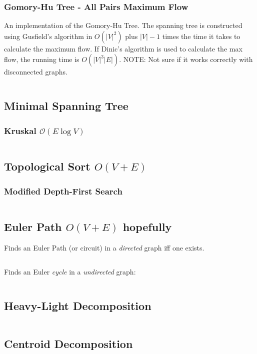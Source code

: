 \documentclass[8pt,a4paper,landscape,oneside]{amsart}
\newcommand{\mintedstyle}[2]{\inputminted[fontsize=\normalsize,baselinestretch=.9,breaklines,tabsize=2]{#1}{code/#2}}
\newcommand{\code}[1]{\mintedstyle{cpp}{#1}}
\begin{document}
\begin{multicols*}{3}
\subsubsection{Gomory-Hu Tree - All Pairs Maximum Flow}
An implementation of the Gomory-Hu Tree. The spanning tree is constructed using Gusfield's algorithm
in $O(|V| ^ 2)$ plus $|V|-1$ times the time it takes to calculate the maximum flow.
If Dinic's algorithm is used to calculate the max flow, the running time is $O(|V|^3|E|)$.
NOTE: Not sure if it works correctly with disconnected graphs.
\code{graphs/gomory_hu_tree.cpp}

\subsection{Minimal Spanning Tree}

\subsubsection{Kruskal $\mathcal{O}(E \log V)$}
\code{graphs/mst_kruskal.cpp}

\subsection{Topological Sort $O(V+E)$}
\subsubsection{Modified Depth-First Search}
\code{graphs/tsort.cpp}

\subsection{Euler Path $O(V+E)$ hopefully}
Finds an Euler Path (or circuit) in a \emph{directed} graph iff one exists.
\code{graphs/euler_path.cpp}
Finds an Euler \emph{cycle} in a \emph{undirected} graph:
\code{graphs/euler_path_undirected.cpp}

\subsection{Heavy-Light Decomposition}
\code{graphs/hld.cpp}

\subsection{Centroid Decomposition}
\code{graphs/centroid_decomposition.cpp}


\end{multicols*}
\end{document}
